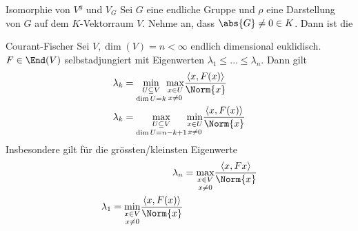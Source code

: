\begin{satz}{Isomorphie von $V^g$ und $V_G$}
    Sei $G$ eine endliche Gruppe und $\rho$ eine Darstellung von $G$ auf dem $K$-Vektorraum $V$. Nehme an, dass $\abs{G} \neq 0 \in K$. Dann ist die
\end{satz}


\begin{satz}{Courant-Fischer}
    Sei $V, \dim(V) = n < \infty$ endlich dimensional euklidisch. $F \in \End(V)$ selbstadjungiert mit Eigenwerten $\lambda_1 \leq \ldots \leq \lambda_n$. Dann gilt
    \begin{align*}
        \lambda_k &= \underset{\dim U = k}{\underset{U \subseteq V}{\min}} \underset{x \neq 0}{\underset{x \in U}{\max}} \frac{\left<x,F(x)\right>}{\Norm{x}}\\
        \lambda_k &= \underset{\dim U = n-k+1}{\underset{U \subseteq V}{\max}} \underset{x \neq 0}{\underset{x \in U}{\min}} \frac{\left<x,F(x)\right>}{\Norm{x}}
    \end{align*} 
    Insbesondere gilt für die grössten/kleinsten Eigenwerte
    \begin{align*}
        \lambda_n &= \underset{x \neq 0}{\underset{x \in V}{\max}} \frac{\left<x,Fx\right>}{\Norm{x}}\\
        \lambda_1 = \underset{x \neq 0}{\underset{x \in V}{\min}} \frac{\left<x,F(x)\right>}{\Norm{x}}
    \end{align*}
\end{satz}

